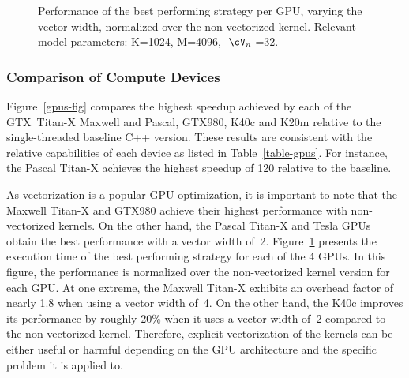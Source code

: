 \begin{figure}[tb]	%
  \centering
  \caption{Performance of the best performing strategy per GPU, varying the
  vector width, normalized over the non-vectorized kernel. Relevant model
  parameters: K=1024, M=4096, $|\Neighbors|$=32.}
  \label{gpus-v-sweep}
\end{figure}

\subsubsection{Comparison of Compute Devices}
Figure~\ref{gpus-fig} compares the highest speedup achieved by each of the
GTX~\mbox{Titan-X} Maxwell and Pascal, GTX980, K40c and K20m relative to the
single-threaded baseline C++ version. These results are consistent with the relative
capabilities of each device as listed in Table~\ref{table-gpus}. For instance,
the Pascal \mbox{Titan-X} achieves the highest speedup of 120 relative to the baseline.

As vectorization is a popular GPU optimization, it is important to note that
the Maxwell \mbox{Titan-X} and GTX980 achieve their highest performance with non-vectorized kernels.
On the other hand, the Pascal \mbox{Titan-X} and Tesla GPUs obtain the best performance with a vector
width of~2. Figure~\ref{gpus-v-sweep} presents the execution time of the best
performing strategy for each of the 4 GPUs. In this figure, the performance is
normalized over the non-vectorized kernel version for each GPU. At one extreme,
the Maxwell \mbox{Titan-X} exhibits an overhead factor of nearly 1.8 when using a vector
width of~4. On the other hand, the K40c improves its performance by roughly
20\% when it uses a vector width of~2 compared to the non-vectorized kernel.
Therefore, explicit vectorization of the kernels can be either useful or
harmful depending on the GPU architecture and the specific problem it is
applied to.



